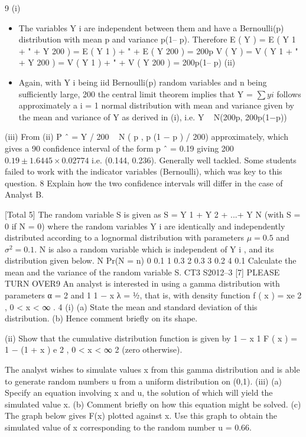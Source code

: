 \documentclass[a4paper,12pt]{article}
\begin{document}
9
(i)
\begin{itemize}
    \item The variables Y i are independent between them and have a Bernoulli(p)
distribution with mean p and variance p(1– p).
Therefore E ( Y ) = E ( Y 1 + " + Y 200 ) = E ( Y 1 ) + " + E ( Y 200 ) = 200p
V ( Y ) = V ( Y 1 + " + Y 200 ) = V ( Y 1 ) + " + V ( Y 200 ) = 200p(1– p)
(ii)
\item Again, with Y i being iid Bernoulli(p) random variables and n being sufficiently
large,
200
the central limit theorem implies that Y = $\sum y i$ follows approximately a
i = 1
normal distribution with mean and variance given by the mean and variance of
Y as derived in (i), i.e.
Y ~ N(200p, 200p(1−p))
\end{itemize}

(iii)
From (ii) P ˆ = Y / 200 ~ N ( p , p (1 − p ) / 200) approximately, which gives a 90%
confidence interval of the form
p ˆ = 0.19 giving
200
$0.19 \pm 1.6445 \times 0.02774$
i.e. (0.144, 0.236).
Generally well tackled. Some students failed to work with the indicator variables (Bernoulli),
which was key to this question.
8
Explain how the two confidence intervals will differ in the case of Analyst B.

[Total 5]
The random variable S is given as S = Y 1 + Y 2 + ...+ Y N (with S = 0 if N = 0) where
the random variables Y i are identically and independently distributed according to a
lognormal distribution with parameters $\mu = 0.5$ and $\sigma^2 = 0.1.$ N is also a random
variable which is independent of Y i , and its distribution given below.
N
Pr(N = n)
0
0.1
1
0.3
2
0.3
3
0.2
4
0.1
Calculate the mean and the variance of the random variable S.
CT3 S2012–3
[7]
PLEASE TURN OVER9
An analyst is interested in using a gamma distribution with parameters α = 2 and
1
1 − x
λ = 1⁄2, that is, with density function f ( x ) = xe 2 , 0 < x < ∞ .
4
(i)
(a) State the mean and standard deviation of this distribution.
(b) Hence comment briefly on its shape.

(ii)
Show that the cumulative distribution function is given by
1
− x
1
F ( x ) = 1 − (1 + x ) e 2 , 0 < x < ∞
2
(zero otherwise).

The analyst wishes to simulate values x from this gamma distribution and is able to
generate random numbers u from a uniform distribution on (0,1).
(iii)
(a) Specify an equation involving x and u, the solution of which will yield
the simulated value x.
(b) Comment briefly on how this equation might be solved.
(c) The graph below gives F(x) plotted against x. Use this graph to obtain
the simulated value of x corresponding to the random number u = 0.66.
\end{document}
